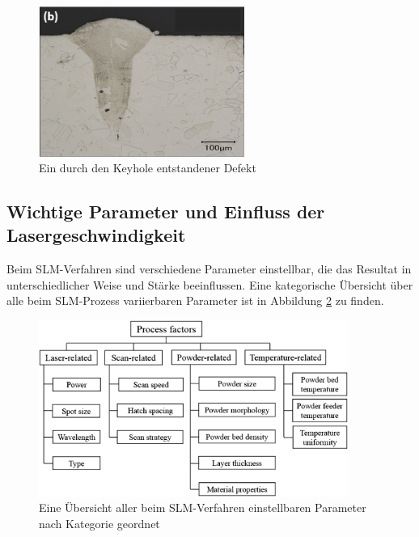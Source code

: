 		\begin{figure}[!ht]
			\centering
			\includegraphics[width=0.6\textwidth]{chapter/main/theory/img/defects/keyhole.png}
			\caption{Ein durch den Keyhole entstandener Defekt \cite{eskandarisabzi2019defect}}
			\label{fig:defects_keyholes}
		\end{figure}

	\subsection{Wichtige Parameter und Einfluss der Lasergeschwindigkeit}
		\label{subsec:parameters}
		Beim SLM-Verfahren sind verschiedene Parameter einstellbar, die das Resultat in
		unterschiedlicher Weise und Stärke beeinflussen. Eine kategorische Übersicht über alle
		beim SLM-Prozess variierbaren Parameter ist in Abbildung \ref{fig:scheme_parameters} zu
		finden.

		\begin{figure}[!ht]
			\centering
			\includegraphics[width=0.9\textwidth]{chapter/main/theory/img/scheme_parameters_2.png}
			\caption{Eine Übersicht aller beim SLM-Verfahren einstellbaren Parameter nach
			Kategorie geordnet \cite{zhang2017defect,aboulkhair2014reducing}}
			\label{fig:scheme_parameters}
		\end{figure}

